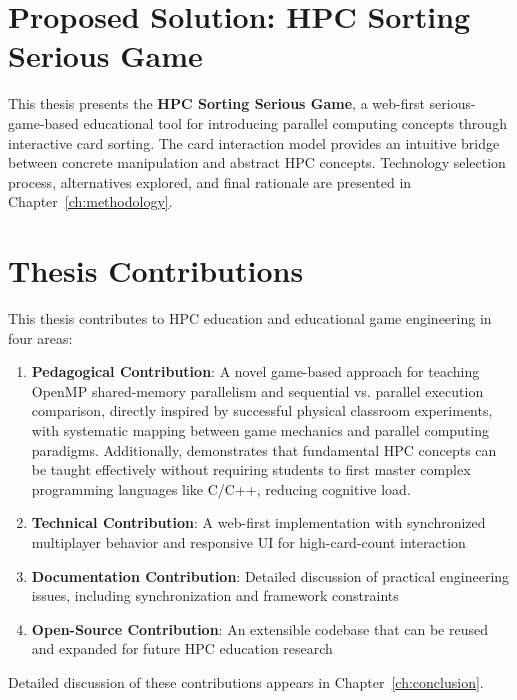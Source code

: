 \section{Proposed Solution: HPC Sorting Serious Game}
\label{sec:proposed-solution}

This thesis presents the \textbf{HPC Sorting Serious Game}, a web-first serious-game-based educational tool for introducing parallel computing concepts through interactive card sorting. The card interaction model provides an intuitive bridge between concrete manipulation and abstract HPC concepts.
Technology selection process, alternatives explored, and final rationale are presented in Chapter~\ref{ch:methodology}.

\section{Thesis Contributions}
\label{sec:contributions}

This thesis contributes to HPC education and educational game engineering in four areas:

\begin{enumerate}
    \item \textbf{Pedagogical Contribution}: A novel game-based approach for teaching OpenMP shared-memory parallelism and sequential vs. parallel execution comparison, directly inspired by successful physical classroom experiments, with systematic mapping between game mechanics and parallel computing paradigms. Additionally, demonstrates that fundamental HPC concepts can be taught effectively without requiring students to first master complex programming languages like C/C++, reducing cognitive load.
    \item \textbf{Technical Contribution}: A web-first implementation with synchronized multiplayer behavior and responsive UI for high-card-count interaction
    \item \textbf{Documentation Contribution}: Detailed discussion of practical engineering issues, including synchronization and framework constraints
    \item \textbf{Open-Source Contribution}: An extensible codebase that can be reused and expanded for future HPC education research
\end{enumerate}

Detailed discussion of these contributions appears in Chapter~\ref{ch:conclusion}.

